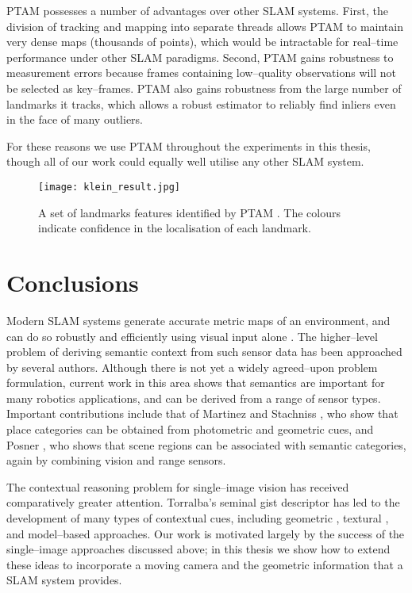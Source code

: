 PTAM possesses a number of advantages over other SLAM systems. First,
the division of tracking and mapping into separate threads allows PTAM
to maintain very dense maps (thousands of points), which would be
intractable for real--time performance under other SLAM paradigms.
Second, PTAM gains robustness to measurement errors because frames
containing low--quality observations will not be selected as
key--frames. PTAM also gains robustness from the large number of
landmarks it tracks, which allows a robust estimator to reliably find
inliers even in the face of many outliers.

For these reasons we use PTAM throughout the experiments in this
thesis, though all of our work could equally well utilise any other
SLAM system.

\begin{figure}[tb]
\centering
\texttt{[image: klein\_result.jpg]}
\caption{A set of landmarks features identified by PTAM
  \cite{Klein07}. The colours indicate confidence in the localisation
  of each landmark.}
\label{fig:klein-result}
\end{figure}




\section{Conclusions}
Modern SLAM systems generate accurate metric maps of an environment,
and can do so robustly and efficiently using visual input alone
\cite{Klein07}. The higher--level problem of deriving semantic context
from such sensor data has been approached by several authors. Although
there is not yet a widely agreed--upon problem formulation, current
work in this area shows that semantics are important for many robotics
applications, and can be derived from a range of sensor
types. Important contributions include that of Martinez \cite{Mozos05}
and Stachniss \cite{Stachniss05}, who show that place categories can
be obtained from photometric and geometric cues, and Posner
\cite{Posner08}, who shows that scene regions can be associated with
semantic categories, again by combining vision and range sensors.

The contextual reasoning problem for single--image vision has received
comparatively greater attention. Torralba's seminal gist descriptor
\cite{Torralba03} has led to the development of many types of
contextual cues, including geometric \cite{Hoiem05,Saxena09}, textural
\cite{Heitz08}, and model--based \cite{Lee09} approaches. Our work is
motivated largely by the success of the single--image approaches
discussed above; in this thesis we show how to extend these ideas to
incorporate a moving camera and the geometric information that a SLAM
system provides.

